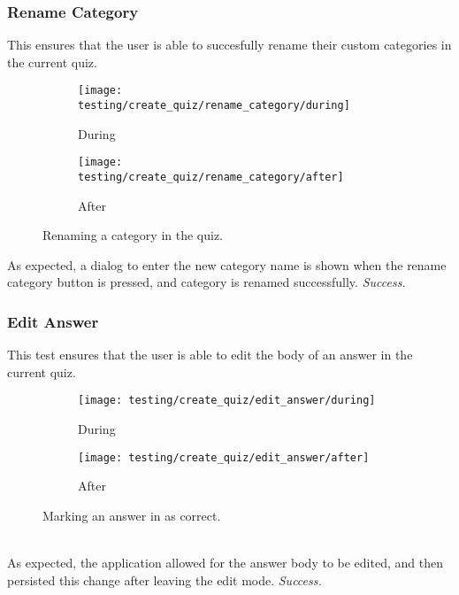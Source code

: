 \subsubsection{Rename Category} %
\label{ssub:add_category}
This ensures that the user is able to succesfully rename their custom categories in the current quiz.
\begin{figure}[!htbp]
\centering
\begin{subfigure}{0.5\textwidth}
  \centering
  \texttt{[image: testing/create\_quiz/rename\_category/during]}
  \caption{During}
  \label{fig:sub1}
\end{subfigure}%
\begin{subfigure}{0.5\textwidth}
  \centering
  \texttt{[image: testing/create\_quiz/rename\_category/after]}
  \caption{After}
  \label{fig:sub2}
\end{subfigure}
\caption{Renaming a category in the quiz.}
\label{fig:test}
\end{figure}
As expected, a dialog to enter the new category name is shown when the rename category button is pressed, and category is renamed successfully. \textit{Success.}

\subsubsection{Edit Answer} %
\label{ssub:add_category}
This test ensures that the user is able to edit the body of an answer in the current quiz.
\begin{figure}[!htbp]
\centering
\begin{subfigure}{0.5\textwidth}
  \centering
  \texttt{[image: testing/create\_quiz/edit\_answer/during]}
  \caption{During}
  \label{fig:sub1}
\end{subfigure}%
\begin{subfigure}{0.5\textwidth}
  \centering
  \texttt{[image: testing/create\_quiz/edit\_answer/after]}
  \caption{After}
  \label{fig:sub2}
\end{subfigure}
\caption{Marking an answer in as correct.}
\label{fig:test}
\end{figure}
\\As expected, the application allowed for the answer body to be edited, and then persisted this change after leaving the edit mode. \textit{Success.}


